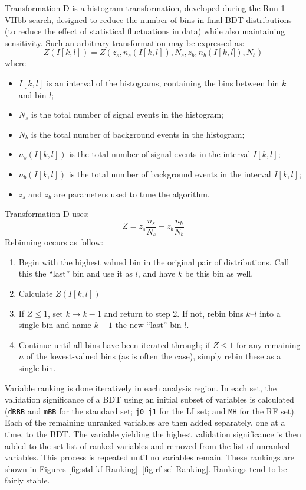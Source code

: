 Transformation D is a histogram transformation, developed during the Run 1 VHbb search, designed to reduce the number of bins in final BDT distributions (to reduce the effect of statistical fluctuations in data) while also maintaining sensitivity.  Such an arbitrary transformation may be expressed as:
\begin{equation}
Z\left(I\left[k,l\right]\right) = Z\left(z_{s},n_{s}\left(I\left[k,l\right]\right),N_{s},z_{b},n_{b}\left(I\left[k,l]\right),N_{b}\right)
\end{equation}
where
\begin{itemize}
\item $I[k,l]$ is an interval of the histograms, containing the bins between bin $k$ and bin $l$;
\item $N_{s}$ is the total number of signal events in the histogram;
\item $N_{b}$ is the total number of background events in the histogram;
\item $n_{s}(I[k,l])$ is the total number of signal events in the interval $I[k,l]$;
\item $n_{b}(I[k,l])$ is the total number of background events in the interval $I[k,l]$;
\item $z_{s}$ and $z_{b}$ are parameters used to tune the algorithm.
\end{itemize}
Transformation D uses:
\begin{equation}
Z = z_{s}\frac{n_{s}}{N_{s}} + z_{b}\frac{n_{b}}{N_{b}}
\end{equation}
Rebinning occurs as follow:
\begin{enumerate}
\item Begin with the highest valued bin in the original pair of distributions.  Call this the ``last'' bin and use it as $l$, and have $k$ be this bin as well.
\item Calculate $Z\left(I\left[k,l\right]\right)$
\item If $Z\le1$, set $k\to k-1$ and return to step 2.  If not, rebin bins $k$--$l$ into a single bin and name $k-1$ the new ``last'' bin $l$.
\item Continue until all bins have been iterated through; if $Z\le1$ for any remaining $n$ of the lowest-valued bins (as is often the case), simply rebin these as a single bin.
\end{enumerate}


Variable ranking is done iteratively in each analysis region.  In each set, the validation significance of a BDT using an initial subset of variables is calculated (\texttt{dRBB} and \texttt{mBB} for the standard set; \texttt{j0\_j1} for the LI set; and \texttt{MH} for the RF set).  Each of the remaining unranked variables are then added separately, one at a time, to the BDT.  The variable yielding the highest validation significance is then added to the set list of ranked variables and removed from the list of unranked variables.  This process is repeated until no variables remain.  These rankings are shown in Figures \ref{fig:std-kf-Ranking}--\ref{fig:rf-sel-Ranking}.  Rankings tend to be fairly stable.

